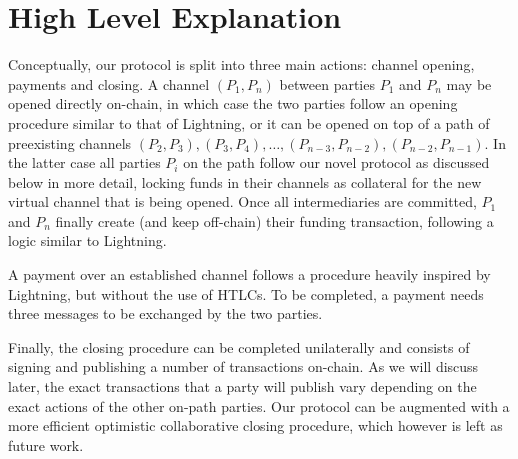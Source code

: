 \section{High Level Explanation}
  Conceptually, our protocol is split into three main actions: channel opening,
  payments and closing. A channel $(P_1, P_n)$ between parties $P_1$ and $P_n$
  may be opened directly on-chain, in which case the two parties follow an
  opening procedure similar to that of Lightning, or it can be opened
  on top of a path of preexisting channels $(P_2, P_3), (P_3, P_4), \dots,
  (P_{n-3}, P_{n-2}), (P_{n-2}, P_{n-1})$. In the latter case all parties $P_i$
  on the path follow our novel protocol as discussed below in more detail,
  locking funds in their channels as collateral for the new virtual channel that
  is being opened. Once all intermediaries are committed, $P_1$ and $P_n$
  finally create (and keep off-chain) their funding transaction, following a
  logic similar to Lightning.

  A payment over an established channel follows a procedure heavily inspired by
  Lightning, but without the use of HTLCs. To be completed, a payment needs
  three messages to be exchanged by the two parties.

  Finally, the closing procedure can be completed unilaterally and consists of
  signing and publishing a number of transactions on-chain. As we will discuss
  later, the exact transactions that a party will publish vary depending on the
  exact actions of the other on-path parties. Our protocol can be augmented with
  a more efficient optimistic collaborative closing procedure, which however is
  left as future work.

